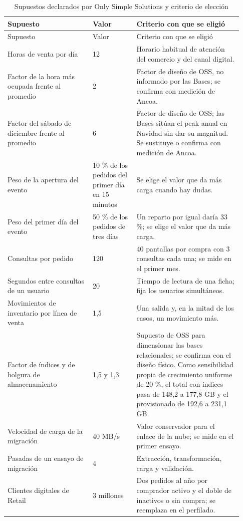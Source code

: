 \documentclass[11pt]{article}
\begin{document}
\begin{longtable}{@{}p{0.331\linewidth}p{0.176\linewidth}p{0.419\linewidth}@{}}
\caption{Supuestos declarados por Only Simple Solutions y criterio de elección}\label{tab:supuestos_a}\\
\toprule Supuesto & Valor & Criterio con que se eligió \\
\midrule\endfirsthead
\toprule Supuesto & Valor & Criterio con que se eligió \\
\midrule\endhead\bottomrule\endlastfoot
Horas de venta por día & 12 & Horario habitual de atención del comercio y del canal digital. \\
Factor de la hora más ocupada frente al promedio & 2 & Factor de diseño de OSS, no informado por las Bases; se confirma con medición de Ancoa. \\
Factor del sábado de diciembre frente al promedio & 6 & Factor de diseño de OSS; las Bases sitúan el peak anual en Navidad sin dar su magnitud. Se sustituye o confirma con medición de Ancoa. \\
Peso de la apertura del evento & 10 \% de los pedidos del primer día en 15 minutos & Se elige el valor que da más carga cuando hay dudas. \\
Peso del primer día del evento & 50 \% de los pedidos de tres días & Un reparto por igual daría 33 \%; se elige el valor que da más carga. \\
Consultas por pedido & 120 & 40 pantallas por compra con 3 consultas cada una; se mide en el primer mes. \\
Segundos entre consultas de un usuario & 20 & Tiempo de lectura de una ficha; fija los usuarios simultáneos. \\
Movimientos de inventario por línea de venta & 1,5 & Una salida y, en la mitad de los casos, un movimiento más. \\
Factor de índices y de holgura de almacenamiento & 1,5 y 1,3 & Supuesto de OSS para dimensionar las bases relacionales; se confirma con el diseño físico. Como sensibilidad propia de crecimiento uniforme de 20 \%, el total con índices pasa de 148,2 a 177,8 GB y el provisionado de 192,6 a 231,1 GB. \\
Velocidad de carga de la migración & 40 MB/s & Valor conservador para el enlace de la nube; se mide en el primer ensayo. \\
Pasadas de un ensayo de migración & 4 & Extracción, transformación, carga y validación. \\
Clientes digitales de Retail & 3 millones & Dos pedidos al año por comprador activo y el doble de inactivos o sin compra; se reemplaza en el perfilado. \\

\end{longtable}
\end{document}
